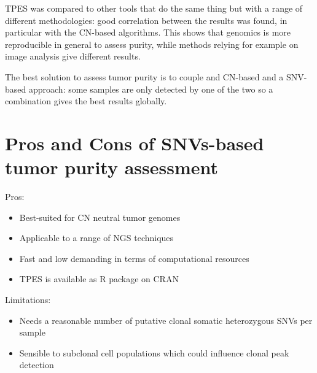 TPES was compared to other tools that do the same thing but with a range of
different methodologies: good correlation between the results was found, in
particular with the CN-based algorithms. This shows that genomics is more
reproducible in general to assess purity, while methods relying for example on
image analysis give different results.

The best solution to assess tumor purity is to couple and CN-based and a
SNV-based approach: some samples are only detected by one of the two so a
combination gives the best results globally.

\section{Pros and Cons of SNVs-based tumor purity assessment}
Pros:
\begin{itemize}
    \item Best-suited for CN neutral tumor genomes
    \item Applicable to a range of NGS techniques
    \item Fast and low demanding in terms of computational resources
    \item TPES is available as R package on CRAN
\end{itemize}
Limitations:
\begin{itemize}
    \item Needs a reasonable number of putative clonal somatic heterozygous SNVs
    per sample
    \item  Sensible to subclonal cell populations which could influence clonal
    peak detection
\end{itemize}
